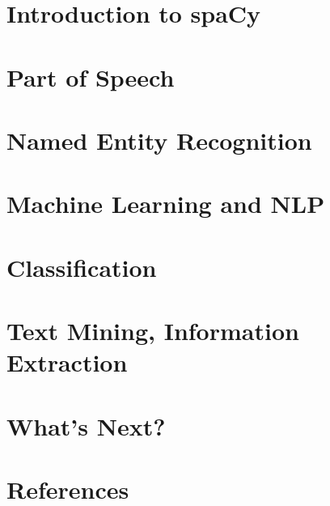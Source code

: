 % 

\section[spaCy]{Introduction to spaCy}


\section[POS]{Part of Speech}
% 



\section[NER]{Named Entity Recognition}
% 


\section[MLNLP]{Machine Learning and NLP}
 


\section[Class]{Classification}



\section[IR]{Text Mining, Information Extraction}
%  


\section[Next]{What's Next?}



\section[Refs]{References}


